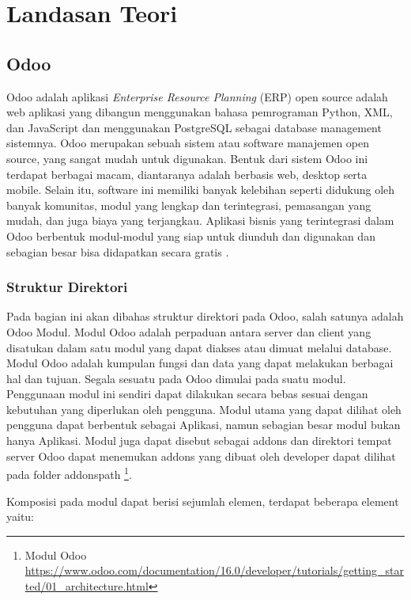 \chapter{Landasan Teori}
\label{sec:landasanteori}

\section{Odoo}
\label{sec:odoo}

Odoo adalah aplikasi \textit{Enterprise Resource Planning} (ERP) open source adalah web aplikasi yang dibangun menggunakan bahasa pemrograman Python, XML, dan JavaScript dan menggunakan PostgreSQL sebagai database management sistemnya.  Odoo merupakan sebuah sistem atau software manajemen open source, yang sangat mudah untuk digunakan. Bentuk dari sistem Odoo ini terdapat berbagai macam, diantaranya adalah berbasis web, desktop serta mobile. Selain itu, software ini memiliki banyak kelebihan seperti didukung oleh banyak komunitas, modul yang lengkap dan terintegrasi, pemasangan yang mudah, dan juga biaya yang terjangkau. Aplikasi bisnis yang terintegrasi dalam Odoo berbentuk modul-modul yang siap untuk diunduh dan digunakan dan sebagian besar bisa didapatkan secara gratis \cite{suminten}.

\subsection{Struktur Direktori}
\label{sec:strukturDirektori}
Pada bagian ini akan dibahas struktur direktori pada Odoo, salah satunya adalah Odoo Modul. Modul Odoo adalah perpaduan antara server dan client yang disatukan dalam satu modul yang dapat diakses atau dimuat melalui database. Modul Odoo adalah kumpulan fungsi dan data yang dapat melakukan berbagai hal dan tujuan. Segala sesuatu pada Odoo dimulai pada suatu modul. Penggunaan modul ini sendiri dapat dilakukan secara bebas sesuai dengan kebutuhan yang diperlukan oleh pengguna. Modul utama yang dapat dilihat oleh pengguna dapat berbentuk sebagai Aplikasi, namun sebagian besar modul bukan hanya Aplikasi. Modul juga dapat disebut sebagai addons dan direktori tempat server Odoo dapat menemukan addons yang dibuat oleh developer dapat dilihat pada folder addonspath \footnote{Modul Odoo \url{https://www.odoo.com/documentation/16.0/developer/tutorials/getting_started/01_architecture.html}}. 

Komposisi pada modul dapat berisi sejumlah elemen, terdapat beberapa element yaitu:

